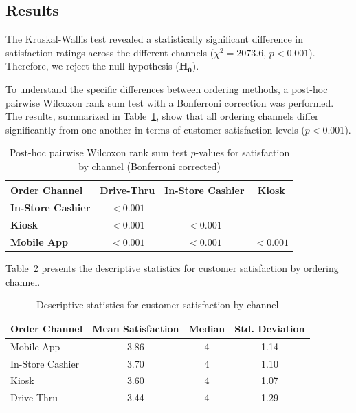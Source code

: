 \documentclass[12pt]{report}
\begin{document}
\subsection{Results}
The Kruskal-Wallis test revealed a statistically significant difference in satisfaction ratings across the different channels (\(\chi^2 = 2073.6\), \(p < 0.001\)). Therefore, we reject the null hypothesis (\(\mathbf{H_0}\)).

To understand the specific differences between ordering methods, a post-hoc pairwise Wilcoxon rank sum test with a Bonferroni correction was performed. The results, summarized in Table~\ref{tab:posthoc_satisfaction}, show that all ordering channels differ significantly from one another in terms of customer satisfaction levels (\(p < 0.001\)).

\begin{table}[H]
    \centering
    \renewcommand{\arraystretch}{1.2}
    \begin{tabular}{l c c c}
        \hline
        \textbf{Order Channel}    & \textbf{Drive-Thru} & \textbf{In-Store Cashier} & \textbf{Kiosk} \\
        \hline
        \textbf{In-Store Cashier} & \(<0.001\)            & --                        & --             \\
        \textbf{Kiosk}            & \(<0.001\)            & \(<0.001\)                  & --             \\
        \textbf{Mobile App}       & \(<0.001\)            & \(<0.001\)                  & \(<0.001\)       \\
        \hline
    \end{tabular}
    \caption{Post-hoc pairwise Wilcoxon rank sum test \(p\)-values for satisfaction by channel (Bonferroni corrected)}\label{tab:posthoc_satisfaction}
\end{table}

Table~\ref{tab:satisfaction_stats} presents the descriptive statistics for customer satisfaction by ordering channel.

\begin{table}[H]
    \centering
    \renewcommand{\arraystretch}{1.2}
    \begin{tabular}{|l|c|c|c|}
        \hline
        \textbf{Order Channel} & \textbf{Mean Satisfaction} & \textbf{Median} & \textbf{Std. Deviation} \\ \hline
        Mobile App             & 3.86                       & 4               & 1.14                    \\ \hline
        In-Store Cashier       & 3.70                       & 4               & 1.10                    \\ \hline
        Kiosk                  & 3.60                       & 4               & 1.07                    \\ \hline
        Drive-Thru             & 3.44                       & 4               & 1.29                    \\ \hline
    \end{tabular}
    \caption{Descriptive statistics for customer satisfaction by channel}\label{tab:satisfaction_stats}
\end{table}
\end{document}

